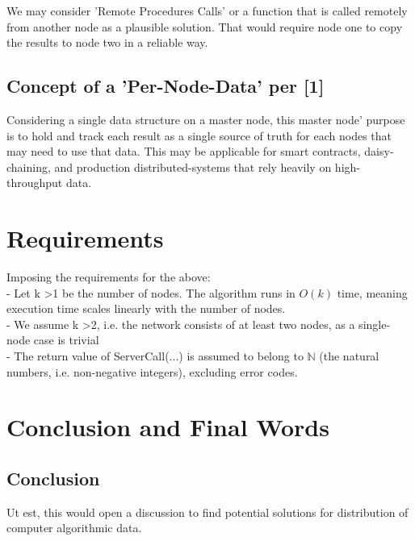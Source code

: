 \documentclass[10pt, twocolumn]{article}
\theoremstyle{plain}
\theoremstyle{definition}
\theoremstyle{remark}
\begin{document}
We may consider 'Remote Procedures Calls' or a function that is called remotely from another node as a plausible solution. That would require node one to copy the results to node two in a reliable way.

\subsection{Concept of a 'Per-Node-Data' per [1]}

Considering a single data structure on a master node, this master node' purpose is to hold and track each result as a single source of truth for each nodes that may need to use that data. This may be applicable for smart contracts, daisy-chaining, and production distributed-systems that rely heavily on high-throughput data.

\section{Requirements}

Imposing the requirements for the above:\\
- Let k \textgreater 1 be the number of nodes. The algorithm runs in $O(k)$ time, meaning execution time scales linearly with the number of nodes.\\
- We assume k \textgreater 2, i.e. the network consists of at least two nodes, as a single-node case is trivial\\
- The return value of ServerCall(...) is assumed to belong to $\mathbb{N}$ (the natural numbers, i.e. non-negative integers), excluding error codes.

\section{Conclusion and Final Words}

\subsection{Conclusion}

Ut est, this would open a discussion to find potential solutions for distribution of computer algorithmic data.

\nocite{*}



\end{document}
